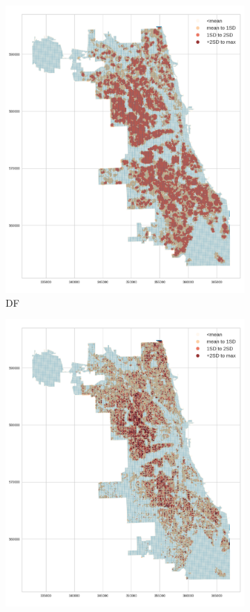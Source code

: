 \begin{figure}[t]
  \centering 
  \begin{subfigure}{0.3\textwidth}
    \includegraphics[scale=0.25]{./figures/DF_riskmap.png}
    \caption{DF}
    \label{fig:non-crime-timeseries-df-risk}
  \end{subfigure}
  \begin{subfigure}{0.3\textwidth}
    \includegraphics[scale=0.25]{./figures/CF_riskmap.png}

\end{subfigure}
\end{figure}
